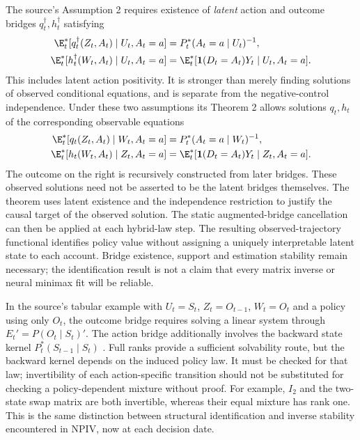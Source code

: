 The source's Assumption 2 requires existence of \emph{latent} action
and outcome bridges $q_t^\dagger,h_t^\dagger$ satisfying
\begin{align*}
 \E_t^*[q_t^\dagger(Z_t,A_t)\mid U_t,A_t=a]
       &=P_t^*(A_t=a\mid U_t)^{-1},\\
 \E_t^*[h_t^\dagger(W_t,A_t)\mid U_t,A_t=a]
       &=\E_t^*[\mathbf1(D_t=A_t)Y_t\mid U_t,A_t=a].
\end{align*}
This includes latent action positivity. It is stronger than merely finding
solutions of observed conditional equations, and is separate from the
negative-control independence. Under these two assumptions its Theorem 2
allows solutions $q_t,h_t$ of the corresponding observable equations
\begin{align*}
 \E_t^*[q_t(Z_t,A_t)\mid W_t,A_t=a]
       &=P_t^*(A_t=a\mid W_t)^{-1},\\
 \E_t^*[h_t(W_t,A_t)\mid Z_t,A_t=a]
       &=\E_t^*[\mathbf1(D_t=A_t)Y_t\mid Z_t,A_t=a].
\end{align*}
The outcome on the right is recursively constructed from later
bridges. These observed solutions need not be asserted to be the latent
bridges themselves. The theorem uses latent existence and the independence
restriction to justify the causal target of the observed solution.
The static augmented-bridge cancellation can then be applied
at each hybrid-law step. The resulting observed-trajectory functional
identifies policy value without assigning a uniquely interpretable
latent state to each account. Bridge existence, support and estimation
stability remain necessary; the identification result is not a claim
that every matrix inverse or neural minimax fit will be reliable.

In the source's tabular example with $U_t=S_t$, $Z_t=O_{t-1}$,
$W_t=O_t$ and a policy using only $O_t$, the outcome bridge requires
solving a linear system through $E_t'=P(O_t\mid S_t)'$.
The action bridge additionally involves the backward state kernel
$P_t^*(S_{t-1}\mid S_t)$ \citep[Proposition 1]{bennettprox2023}.
Full ranks provide a sufficient solvability route, but the backward
kernel depends on the induced policy law. It must be checked for that
law; invertibility of each action-specific transition should not be
substituted for checking a policy-dependent mixture without proof.
For example, $I_2$ and the two-state swap matrix are both invertible,
whereas their equal mixture has rank one.
This is the same distinction between structural identification and
inverse stability encountered in NPIV, now at each decision date.

